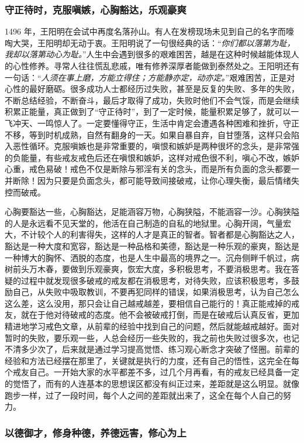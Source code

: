 \subsubsection{守正待时，克服嗔嫉，心胸豁达，乐观豪爽}

1496 年，王阳明在会试中再度名落孙山。有人在发榜现场未见到自己的名字而嚎啕大哭，王阳明却无动于衷。王阳明说了一句很经典的话：“\textit{你们都以落第为耻，我却以落第动心为耻。}”人生中会遇到很多的艰难困苦，越是在这种时候越能体现人的心性修养。寻常人往往慌乱悲戚，唯有修养深厚者能做到泰然处之。王阳明还有一句话：“\textit{人须在事上磨，方能立得住；方能静亦定，动亦定。}”艰难困苦，正是对心性的最好磨砺。很多成功人士都经历过失败，甚至是反复的失败、多年的失败，不断总结经验，不断奋斗，最后才取得了成功，失败时他们不会气馁，而是会继续积累正能量，真正做到了“守正待时”，到了一定时候，能量积累足够了，就可以一飞冲天、一鸣惊人了。一定要懂得守正，生活中肯定会遭遇各种困难和挫折，守正不移，等到时机成熟，自然有翻身的一天。如果自暴自弃，自甘堕落，这样只会陷入恶性循环。克服嗔嫉也是非常重要的，嗔恨和嫉妒是两种很坏的念头，是非常强的负能量，有些戒友戒色后还在嗔恨和嫉妒，这样对戒色很不利，嗔心不改，嫉妒心重，戒色易破！戒色不仅是断除与邪淫有关的念头，而是所有负面的念头都要一并断除！因为只要是负面念头，都可能导致间接破戒，让你心理失衡，最后情绪失控而破戒。

心胸要豁达一些，心胸豁达，足能涵容万物，心胸狭隘，不能涵容一沙。心胸狭隘的人是永远看不见天堂的，他活在自己制造的自私的地狱里。心胸开阔，气量宏大，不计较个人的利害得失，这样的人才是真正的智者。智者都是心胸豁达之人，豁达是一种大度和宽容，豁达是一种品格和美德，豁达是一种乐观的豪爽，豁达是一种博大的胸怀、洒脱的态度，也是人生中最高的境界之一。沉舟侧畔千帆过，病树前头万木春，要做到乐观豪爽，恢宏大度，多积极思考，不要消极思考。我在答疑的过程中就发现很多破戒的戒友都在消极思考，对待失败，应该积极思考，多鼓励自己，从失败中吸取教训，不要再犯同样的错误，如果消极思考，认为自己怎么这么差，这么没用，那只会让自己越戒越差，要相信自己能行的！真正能戒掉的戒友，就在于他对待破戒的态度。他不会被破戒打倒，而是在破戒后认真反省，更加精进地学习戒色文章，从前辈的经验中找到自己的问题，然后就能越戒越好。面对暂时的失败，要乐观一些，人总会经历一些失败的，我之前也失败过很多次，也记不清多少次了，后来就是通过学习提高觉悟、练习观心断念才突破了怪圈。前辈的经验和方法已经摆在那里了，关键就是执行的力度，还有自己的悟性，这完全在每个戒友自己。一开始大家的水平都差不多，过几个月再看，有的戒友已经具备一定的觉悟了，而有的人连基本的思想误区都没有纠正过来，差距就是这么明显。就像跑步一样，过了一段时间，每个人之间的差距就出来了，这全在每个人自己的努力。

\subsubsection{以德御才，修身种德，养德远害，修心为上}

